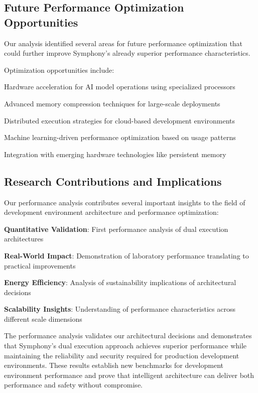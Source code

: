 \subsection*{Future Performance Optimization Opportunities}

Our analysis identified several areas for future performance optimization that could further improve Symphony's already superior performance characteristics.

Optimization opportunities include:

\begin{compactlist}
    \item Hardware acceleration for AI model operations using specialized processors
    \item Advanced memory compression techniques for large-scale deployments
    \item Distributed execution strategies for cloud-based development environments
    \item Machine learning-driven performance optimization based on usage patterns
    \item Integration with emerging hardware technologies like persistent memory
\end{compactlist}

\subsection*{Research Contributions and Implications}

Our performance analysis contributes several important insights to the field of development environment architecture and performance optimization:

\begin{expandedlist}
    \item \textbf{Quantitative Validation}: First performance analysis of dual execution architectures
    \item \textbf{Real-World Impact}: Demonstration of laboratory performance translating to practical improvements
    \item \textbf{Energy Efficiency}: Analysis of sustainability implications of architectural decisions
    \item \textbf{Scalability Insights}: Understanding of performance characteristics across different scale dimensions
\end{expandedlist}

The performance analysis validates our architectural decisions and demonstrates that Symphony's dual execution approach achieves superior performance while maintaining the reliability and security required for production development environments. These results establish new benchmarks for development environment performance and prove that intelligent architecture can deliver both performance and safety without compromise.
